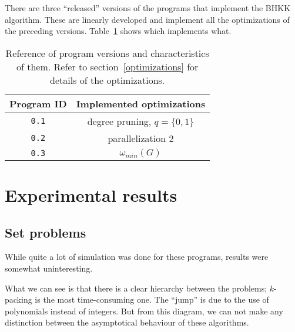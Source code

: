 \documentclass{cslthse-msc}
\newcommand{\code}{\texttt}
\begin{document}
There are three ``released'' versions of the programs that implement the BHKK algorithm. These are linearly developed and implement all the optimizations of the preceding versions. Table~\ref{versions} shows which implements what.

\begin{table}[t]\centering
 \begin{tabular}{c|c} \hline
  Program ID & Implemented optimizations \\ \hline
  \code{0.1} & degree pruning, $q = \{0, 1\}$ \\ \hline
  \code{0.2} & parallelization 2 \\ \hline
  \code{0.3} & $\omega_{min}(G)$ \\ \hline
 \end{tabular}
 \caption{Reference of program versions and characteristics of them. Refer to section~\ref{optimizations} for details of the optimizations.}
 \label{versions}
\end{table}


\chapter{Experimental results}

\section{Set problems}
While quite a lot of simulation was done for these programs, results were somewhat uninteresting. 




What we can see is that there is a clear hierarchy between the problems; $k$-packing is the most time-consuming one. The ``jump'' is due to the use of polynomials instead of integers. But from this diagram, we can not make any distinction between the asymptotical behaviour of these algorithms.
\end{document}
